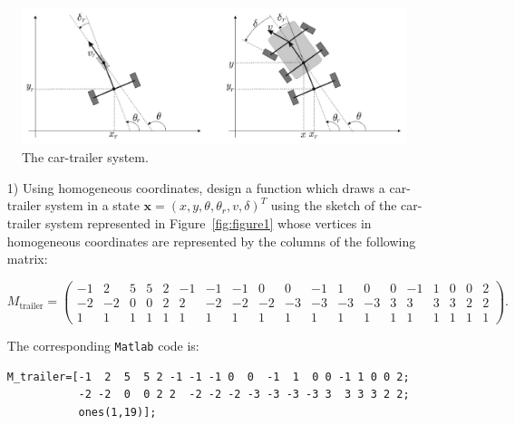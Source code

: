 \documentclass{article}
\begin{document}
\begin{figure}[H]
\centerline{\includegraphics[width=0.99\columnwidth]{figures/car-trailer}}
\caption{The car-trailer system.}
\label{fig:figure}
\end{figure}



\begin{itemize}

\item[1)] Using homogeneous coordinates, design a function which draws a car-trailer system in a state $\mathbf{x} =
(x, y, \theta, \theta_r, v, \delta)^T$ using the sketch of the car-trailer system represented in Figure~\ref{fig:figure1} 
whose vertices in homogeneous coordinates are represented by the columns of the following matrix:

\begin{scriptsize}
 \begin{equation*}
M_{\text{trailer}} =
\begin{pmatrix}
-1 & 2  &5  &5 &2 &-1 &-1 &-1 &0  &0  &-1  &1  &0 &0 &-1 &1 &0 &0 &2 \\
-2 &-2 &0  &0 &2 &2  &-2 &-2 &-2 &-3 &-3 &-3 &-3 &3  &3 &3 &3 &2 &2\\
1 &1 &1  &1   &1   &1 &1 &1 &1 &1 &1 &1 &1 &1 &1 &1 &1 &1 &1
\end{pmatrix}.
\end{equation*}
\end{scriptsize}
The corresponding \texttt{Matlab} code is:
\begin{scriptsize}
\begin{verbatim}
M_trailer=[-1  2  5  5 2 -1 -1 -1 0  0  -1  1  0 0 -1 1 0 0 2; 
           -2 -2  0  0 2 2  -2 -2 -2 -3 -3 -3 -3 3  3 3 3 2 2;
           ones(1,19)];
\end{verbatim}                    
\end{scriptsize}                    
                    

\end{itemize}
\end{document}
